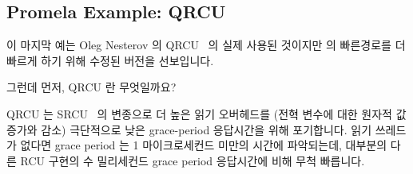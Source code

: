 \subsection{Promela Example: QRCU}
\label{sec:formal:Promela Example: QRCU}

이 마지막 예는 Oleg Nesterov 의
QRCU~\cite{OlegNesterov2006QRCU,OlegNesterov2006aQRCU} 의 실제 사용된 것이지만
 의 빠른경로를 더 빠르게 하기 위해 수정된 버전을
선보입니다.

그런데 먼저, QRCU 란 무엇일까요?

QRCU 는 SRCU~\cite{PaulEMcKenney2006c} 의 변종으로 더 높은 읽기 오버헤드를
(전혁 변수에 대한 원자적 값 증가와 감소) 극단적으로 낮은 grace-period
응답시간을 위해 포기합니다.
읽기 쓰레드가 없다면 grace period 는 1 마이크로세컨드 미만의 시간에 파악되는데,
대부분의 다른 RCU 구현의 수 밀리세컨드 grace period 응답시간에 비해 무척
빠릅니다.

\iffalse

This final example demonstrates a real-world use of Promela on Oleg
Nesterov's
QRCU~\cite{OlegNesterov2006QRCU,OlegNesterov2006aQRCU},
but modified to speed up the \co{synchronize_qrcu()}
fastpath.

But first, what is QRCU?

QRCU is a variant of SRCU~\cite{PaulEMcKenney2006c}
that trades somewhat higher read overhead
(atomic increment and decrement on a global variable) for extremely
low grace-period latencies.
If there are no readers, the grace period will be detected in less
than a microsecond, compared to the multi-millisecond grace-period
latencies of most other RCU implementations.

\fi


